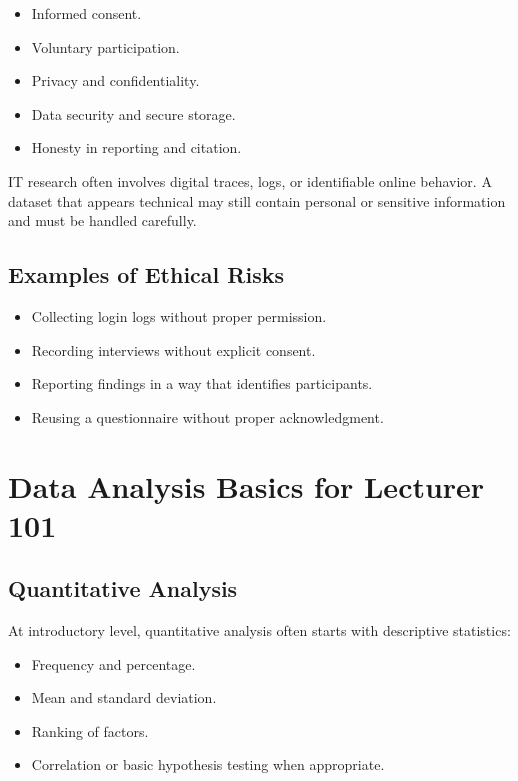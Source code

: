 \documentclass[11pt,a4paper]{article}
\begin{document}
\begin{itemize}[leftmargin=*]
  \item Informed consent.
  \item Voluntary participation.
  \item Privacy and confidentiality.
  \item Data security and secure storage.
  \item Honesty in reporting and citation.
\end{itemize}

\begin{alertbox}
IT research often involves digital traces, logs, or identifiable online behavior. A dataset that appears technical may still contain personal or sensitive information and must be handled carefully.
\end{alertbox}

\subsection{Examples of Ethical Risks}

\begin{itemize}[leftmargin=*]
  \item Collecting login logs without proper permission.
  \item Recording interviews without explicit consent.
  \item Reporting findings in a way that identifies participants.
  \item Reusing a questionnaire without proper acknowledgment.
\end{itemize}

\section{Data Analysis Basics for Lecturer 101}

\subsection{Quantitative Analysis}

At introductory level, quantitative analysis often starts with descriptive statistics:

\begin{itemize}[leftmargin=*]
  \item Frequency and percentage.
  \item Mean and standard deviation.
  \item Ranking of factors.
  \item Correlation or basic hypothesis testing when appropriate.
\end{itemize}
\end{document}

